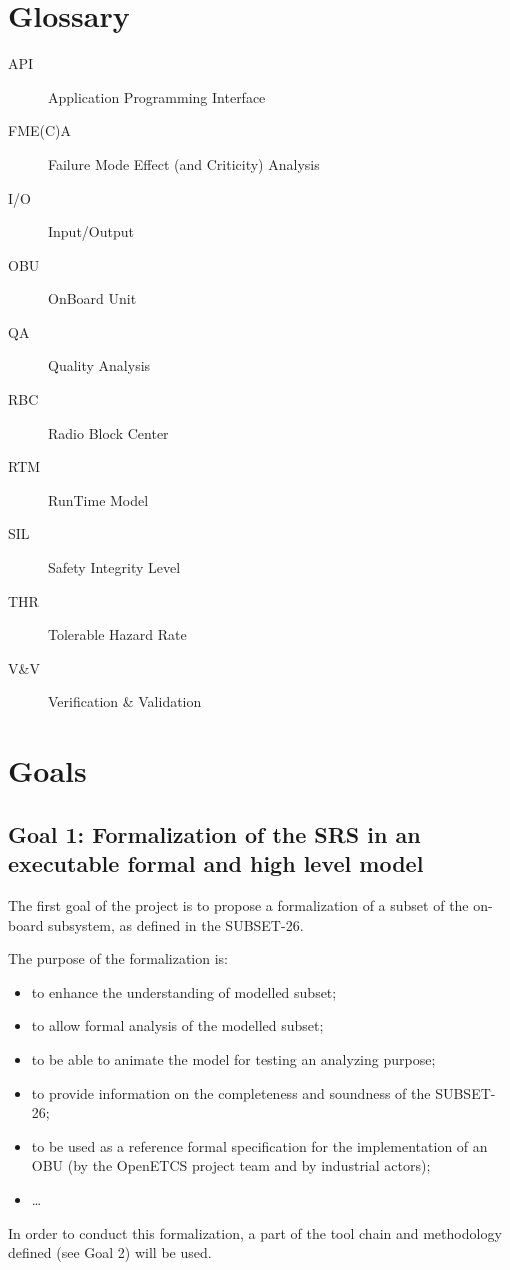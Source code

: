 \documentclass{template/openetcs_article}
\begin{document}
\section{Glossary}
\begin{description}
\item[API] Application Programming Interface
\item[FME(C)A] Failure Mode Effect (and Criticity) Analysis
\item[I/O] Input/Output
\item[OBU] OnBoard Unit
\item[QA] Quality Analysis
\item[RBC] Radio Block Center
\item[RTM] RunTime Model
\item[SIL] Safety Integrity Level
\item[THR] Tolerable Hazard Rate
\item[V\&V] Verification \& Validation
\end{description}

\section{Goals}
\subsection{Goal 1: Formalization of the SRS in an executable formal and high level model}
The first goal of the project is to propose a formalization of a subset of the on-board subsystem,
as defined in the SUBSET-26. 

The purpose of the formalization is:
\begin{itemize}
\item to enhance the understanding of modelled subset;
\item to allow formal analysis of the modelled subset;
\item to be able to animate the model for testing an analyzing purpose;
\item to provide information on the completeness and soundness of the SUBSET-26;
\item to be used as a reference formal specification for the implementation of an OBU 
(by the OpenETCS project team and by industrial actors);
\item \dots
\end{itemize}

In order to conduct this formalization, a part of the tool chain and methodology defined (see Goal 2) 
will be used.
\end{document}
